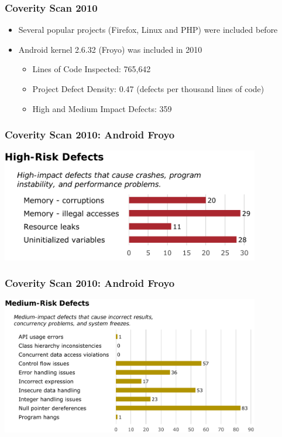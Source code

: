 \documentclass{beamer}
\begin{document}


\begin{frame}
\frametitle{Coverity Scan 2010}
\begin{itemize}
\item Several popular projects (Firefox, Linux and PHP) were included before
\item Android kernel 2.6.32 (Froyo) was included in 2010
\begin{itemize}
\item Lines of Code Inspected: 765,642
\item Project Defect Density: 0.47 (defects per thousand lines of code)
\item High and Medium Impact Defects: 359
\end{itemize}
\end{itemize}
\end{frame}


\begin{frame}
\frametitle{Coverity Scan 2010: Android Froyo}
\begin{center}
  \includegraphics[width=11.3cm]{figs/Coverity_Froyo_High_Risk_Defects.png}
\end{center}
\end{frame}


\begin{frame}
\frametitle{Coverity Scan 2010: Android Froyo}
\begin{center}
  \includegraphics[width=11.3cm]{figs/Coverity_Froyo_Medium_Risk_Defects.png}
\end{center}
\end{frame}
\end{document}
